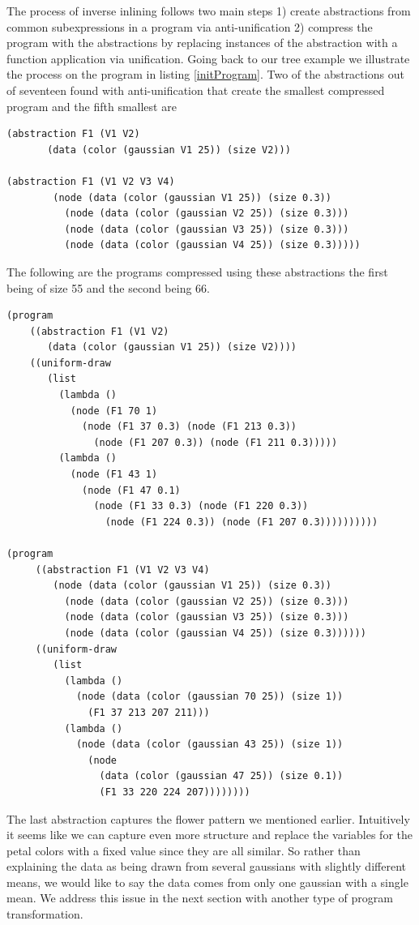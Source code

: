 \documentclass[a4paper,10pt]{article}
\begin{document}
The process of inverse inlining follows two main steps 1) create abstractions from common subexpressions in a program via anti-unification 2) compress the program with the abstractions by replacing instances of the abstraction with a function application via unification.  Going back to our tree example we illustrate the process on the program in listing \ref{initProgram}.
Two of the abstractions out of seventeen found with anti-unification that create the smallest compressed program and the fifth smallest are 
\begin{lstlisting}
(abstraction F1 (V1 V2)
       (data (color (gaussian V1 25)) (size V2)))

(abstraction F1 (V1 V2 V3 V4)
        (node (data (color (gaussian V1 25)) (size 0.3))
          (node (data (color (gaussian V2 25)) (size 0.3)))
          (node (data (color (gaussian V3 25)) (size 0.3)))
          (node (data (color (gaussian V4 25)) (size 0.3)))))
\end{lstlisting}
The following are the programs compressed using these abstractions the first being of size 55 and the second being 66.
\begin{lstlisting}
(program
    ((abstraction F1 (V1 V2)
       (data (color (gaussian V1 25)) (size V2))))
    ((uniform-draw
       (list
         (lambda ()
           (node (F1 70 1)
             (node (F1 37 0.3) (node (F1 213 0.3))
               (node (F1 207 0.3)) (node (F1 211 0.3)))))
         (lambda ()
           (node (F1 43 1)
             (node (F1 47 0.1)
               (node (F1 33 0.3) (node (F1 220 0.3))
                 (node (F1 224 0.3)) (node (F1 207 0.3))))))))))

(program
     ((abstraction F1 (V1 V2 V3 V4)
        (node (data (color (gaussian V1 25)) (size 0.3))
          (node (data (color (gaussian V2 25)) (size 0.3)))
          (node (data (color (gaussian V3 25)) (size 0.3)))
          (node (data (color (gaussian V4 25)) (size 0.3))))))
     ((uniform-draw
        (list
          (lambda ()
            (node (data (color (gaussian 70 25)) (size 1))
              (F1 37 213 207 211)))
          (lambda ()
            (node (data (color (gaussian 43 25)) (size 1))
              (node
                (data (color (gaussian 47 25)) (size 0.1))
                (F1 33 220 224 207))))))))
\end{lstlisting}
The last abstraction captures the flower pattern we mentioned earlier.  Intuitively it seems like we can capture even more structure and replace the variables for the petal colors with a fixed value since they are all similar.  So rather than explaining the data as being drawn from several gaussians with slightly different means, we would like to say the data comes from only one gaussian with a single mean.  We address this issue in the next section with another type of program transformation.
\end{document}
